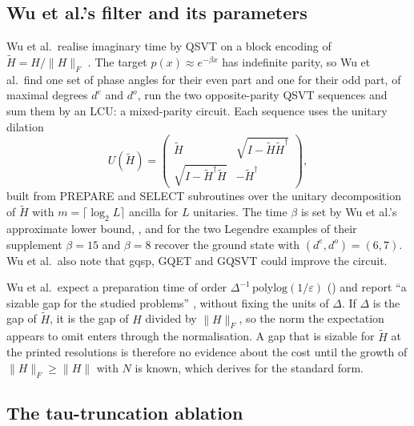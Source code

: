 \subsection{Wu et al.'s filter and its parameters}
\label{app:paper-filter}
Wu et al.\ realise imaginary time by QSVT on a block encoding of $\tilde H = H/\|H\|_F$ \cite{wu2025pihm}. The target $p(x)\approx e^{-\beta x}$ has indefinite parity, so Wu et al.\ find one set of phase angles for their even part and one for their odd part, of maximal degrees $d^e$ and $d^o$, run the two opposite-parity QSVT sequences and sum them by an LCU: a mixed-parity circuit. Each sequence uses the unitary dilation
\begin{equation}
    U(\tilde H) = \begin{pmatrix} \tilde H & \sqrt{I-\tilde H\tilde H^\dagger} \\ \sqrt{I-\tilde H^\dagger\tilde H} & -\tilde H^\dagger \end{pmatrix},
\end{equation}
built from PREPARE and SELECT subroutines over the unitary decomposition of $\tilde H$ with $m = \lceil\log_2 L\rceil$ ancilla for $L$ unitaries. The time $\beta$ is set by Wu et al.'s approximate lower bound, , and for the two Legendre examples of their supplement $\beta=15$ and $\beta=8$ recover the ground state with $(d^e,d^o)=(6,7)$. Wu et al.\ also note that \gls{gqsp}, GQET and GQSVT could improve the circuit.

Wu et al.\ expect a preparation time of order $\Delta^{-1}\,\mathrm{polylog}(1/\varepsilon)$ () and report ``a sizable gap for the studied problems'' \cite{wu2025pihm}, without fixing the units of $\Delta$. If $\Delta$ is the gap of $\tilde H$, it is the gap of $H$ divided by $\|H\|_F$, so the norm the expectation appears to omit enters through the normalisation. A gap that is sizable for $\tilde H$ at the printed resolutions is therefore no evidence about the cost until the growth of $\|H\|_F\ge\|H\|$ with $N$ is known, which  derives for the standard form.

\subsection{The tau-truncation ablation}
\label{app:repro-tau}

